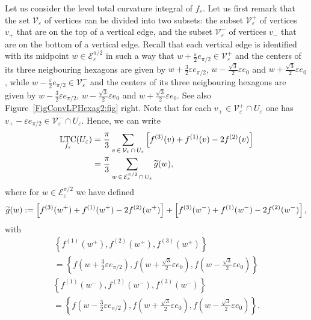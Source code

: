 \documentclass[AHL,Unicode,longabstracts,published]{cedram}
\newcommand{\eps}{\varepsilon}
\DeclareMathOperator{\LTC}{LTC}
\newcommand{\calV}{\mathcal{V}}
\newcommand{\calE}{\mathcal{E}}
\let\oldtilde\tilde
\renewcommand*{\tilde}[1]{\mathchoice{\widetilde{#1}}{\widetilde{#1}}{\oldtilde{#1}}{\oldtilde{#1}}}
\begin{document}
Let us consider the level total curvature integral of $f_\eps$. Let us first remark that the set $\calV_\eps$ of vertices can be divided into two subsets: the subset $\calV_\eps^+$ of vertices $v_+$ that are on the top of a vertical edge, and the subset $\calV_\eps^-$ of vertices $v_-$ that are on the bottom of a vertical edge. Recall that each vertical edge is identified with its midpoint $w\in \calE_\eps^{\pi/2}$ in such a way that $w+\frac{\eps}{2} e_{\pi/2}\in\calV_\eps^+$ and the centers of its three neigbouring hexagons are given by $w + \tfrac{3}{2}\eps e_{\pi/2}$, $w - \tfrac{\sqrt{3}}{2}\eps e_{0}$ and $w + \tfrac{\sqrt{3}}{2}\eps e_{0}$, while $w- \tfrac{\eps}{2} e_{\pi/2}\in\calV_\eps^-$ and the centers of its three neigbouring hexagons are given by $w - \frac{3}{2}\eps e_{\pi/2}$, $w - \tfrac{\sqrt{3}}{2}\eps e_{0}$ and $w + \tfrac{\sqrt{3}}{2}\eps e_{0}$. See also Figure~\ref{FigConvLPHexag2:fig} right. Note that for each $v_+\in \calV_\eps^+ \cap U_\eps$ one has $v_+-\eps e_{\pi/2}\in \calV_\eps^- \cap U_\eps$. Hence, we can write
\begin{align*}
\LTC_{f_\eps}(U_\eps)&=\frac{\pi}{3} \sum_{v\,\in\,\calV_\varepsilon\,\cap\,U_\eps} \left[f^{(3)}(v) + f^{(1)}(v)-2 f^{(2)}(v)\right]\\
&= \frac{\pi}{3} \sum_{w\,\in\,\calE_\varepsilon^{\pi/2}\,\cap\,U_\eps} \tilde{g}(w),
\end{align*}
where for $w\in \calE_\varepsilon^{\pi/2}$ we have defined
\[
\tilde{g}(w) := \left[f^{(3)}(w^+) +
f^{(1)}(w^+)-2 f^{(2)}(w^+)\right]+\left[f^{(3)}(w^-) +
f^{(1)}(w^-)-2 f^{(2)}(w^-)\right],
\]
with
\begin{multline*}
\left\{f^{(1)}(w^+), f^{(2)}(w^+),f^{(3)}(w^+)\right\}\\
=\left\{f\left(w+\frac{3}{2}\eps e_{\pi/2}\right), f\left(w+\frac{\sqrt{3}}{2}\eps e_{0}\right),f\left(w-\frac{\sqrt{3}}{2}\eps e_{0}\right)\right\}
\end{multline*}
\begin{multline*}
\left\{f^{(1)}(w^-), f^{(2)}(w^-),f^{(3)}(w^-)\right\}\\
=\left\{f\left(w-\frac{3}{2}\eps e_{\pi/2}\right), f\left(w+\frac{\sqrt{3}}{2}\eps e_{0}\right),f\left(w-\frac{\sqrt{3}}{2}\eps e_{0}\right)\right\}.
\end{multline*}
\end{document}
